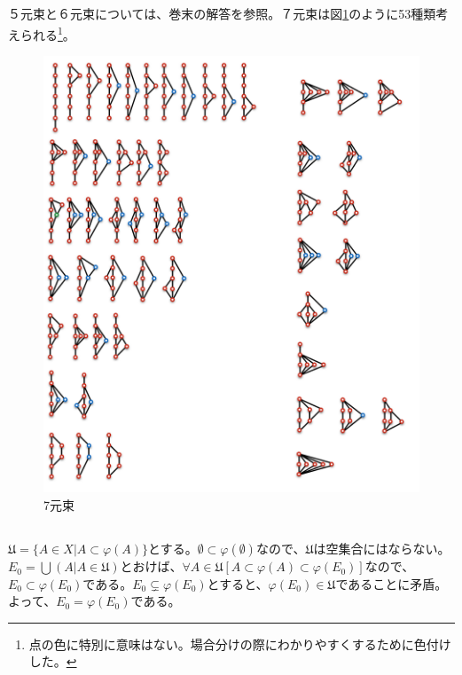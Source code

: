 \documentclass{jsarticle}
\begin{document}
\subsection{}
５元束と６元束については、巻末の解答を参照。７元束は図\ref{fig:8_6}のように53種類考えられる\footnote{点の色に特別に意味はない。場合分けの際にわかりやすくするために色付けした。}。
\begin{figure}[htbp]
  \begin{center}
    \includegraphics[clip,width=13.0cm]{8_6.png}
    \caption{7元束}
    \label{fig:8_6}
  \end{center}
\end{figure}

\newpage
\subsection{}
$\mathfrak{U}=\{A\in X|A\subset\varphi(A)\}$とする。$\emptyset\subset\varphi(\emptyset)$なので、$\mathfrak{U}$は空集合にはならない。$E_0=\bigcup (A|A\in\mathfrak{U})$とおけば、$\forall A\in\mathfrak{U}[A\subset\varphi(A)\subset\varphi(E_0)]$なので、$E_0\subset\varphi(E_0)$である。$E_0\subsetneq\varphi(E_0)$とすると、$\varphi(E_0)\in\mathfrak{U}$であることに矛盾。よって、$E_0=\varphi(E_0)$である。
\end{document}
